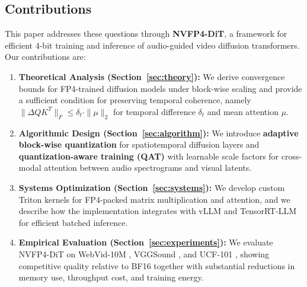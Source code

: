 \documentclass[journal,twoside]{IEEEtran}
\theoremstyle{definition}
\theoremstyle{remark}
\begin{document}
\subsection{Contributions}
This paper addresses these questions through \textbf{NVFP4-DiT}, a framework for efficient 4-bit training and inference of audio-guided video diffusion transformers. Our contributions are:

\begin{enumerate}
    \item \textbf{Theoretical Analysis (Section~\ref{sec:theory}):} We derive convergence bounds for FP4-trained diffusion models under block-wise scaling and provide a sufficient condition for preserving temporal coherence, namely $\|\Delta Q K^T\|_F \leq \delta_t \cdot \|\mu\|_2$ for temporal difference $\delta_t$ and mean attention $\mu$.
    
    \item \textbf{Algorithmic Design (Section~\ref{sec:algorithm}):} We introduce \textbf{adaptive block-wise quantization} for spatiotemporal diffusion layers and \textbf{quantization-aware training (QAT)} with learnable scale factors for cross-modal attention between audio spectrograms and visual latents.
    
    \item \textbf{Systems Optimization (Section~\ref{sec:systems}):} We develop custom Triton \cite{tillet2019triton} kernels for FP4-packed matrix multiplication and attention, and we describe how the implementation integrates with vLLM \cite{kwon2023efficient} and TensorRT-LLM \cite{nvidia2024tensorrt} for efficient batched inference.
    
    \item \textbf{Empirical Evaluation (Section~\ref{sec:experiments}):} We evaluate NVFP4-DiT on WebVid-10M \cite{bain2021frozen}, VGGSound \cite{chen2020vggsound}, and UCF-101 \cite{soomro2012ucf101}, showing competitive quality relative to BF16 together with substantial reductions in memory use, throughput cost, and training energy.
\end{enumerate}
\end{document}
